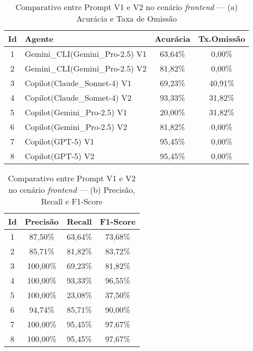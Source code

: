 \begin{table}[H]
\centering
\caption{Comparativo entre Prompt V1 e V2 no cenário \textit{frontend} — (a) Acurácia e Taxa de Omissão}
\label{tab:frontend-a}
\begin{tabular}{|c|l|c|c|}
\hline
\textbf{Id} & \textbf{Agente} & \textbf{Acurácia} & \textbf{Tx.Omissão} \\
\hline
1 & Gemini\_CLI(Gemini\_Pro-2{.}5) V1 & 63{,}64\% & 0{,}00\% \\
2 & Gemini\_CLI(Gemini\_Pro-2{.}5) V2 & 81{,}82\% & 0{,}00\% \\
\hline
3 & Copilot(Claude\_Sonnet-4) V1      & 69{,}23\% & 40{,}91\% \\
4 & Copilot(Claude\_Sonnet-4) V2      & 93{,}33\% & 31{,}82\% \\
\hline
5 & Copilot(Gemini\_Pro-2{.}5) V1     & 20{,}00\% & 31{,}82\% \\
6 & Copilot(Gemini\_Pro-2{.}5) V2     & 81{,}82\% & 0{,}00\% \\
\hline
7 & Copilot(GPT-5) V1                 & 95{,}45\% & 0{,}00\% \\
8 & Copilot(GPT-5) V2                 & 95{,}45\% & 0{,}00\% \\
\hline
\end{tabular}
\vspace{0.8em}
\end{table}

\begin{table}[H]
\centering
\caption{Comparativo entre Prompt V1 e V2 no cenário \textit{frontend} — (b) Precisão, Recall e F1-Score}
\label{tab:frontend-b}
\begin{tabular}{|c|c|c|c|}
\hline
\textbf{Id} & \textbf{Precisão} & \textbf{Recall} & \textbf{F1-Score} \\
\hline
1 & 87{,}50\% & 63{,}64\% & 73{,}68\% \\
2 & 85{,}71\% & 81{,}82\% & 83{,}72\% \\
\hline
3 & 100{,}00\% & 69{,}23\% & 81{,}82\% \\
4 & 100{,}00\% & 93{,}33\% & 96{,}55\% \\
\hline
5 & 100{,}00\% & 23{,}08\% & 37{,}50\% \\
6 & 94{,}74\% & 85{,}71\% & 90{,}00\% \\
\hline
7 & 100{,}00\% & 95{,}45\% & 97{,}67\% \\
8 & 100{,}00\% & 95{,}45\% & 97{,}67\% \\
\hline
\end{tabular}
\vspace{0.8em}
\end{table}


